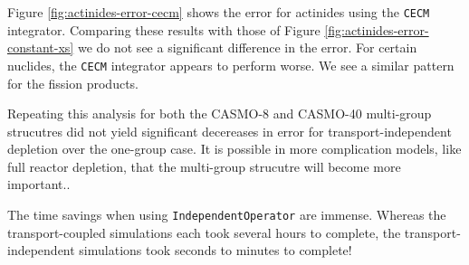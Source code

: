     Figure \ref{fig:actinides-error-cecm} shows the error for actinides using the
    \verb.CECM. integrator. Comparing these results with those of Figure
    \ref{fig:actinides-error-constant-xs} we do not see a significant difference
    in the error. For certain nuclides, the \verb.CECM. integrator appears to
    perform worse. We see a similar pattern for the fission products.

    Repeating this analysis for both the CASMO-8 and CASMO-40 multi-group
    strucutres did not yield significant decereases in error for
    transport-independent depletion over the one-group case. It is possible in
    more complication models, like full reactor depletion, that the multi-group
    strucutre will become more important..

    The time savings when using \verb.IndependentOperator. are immense. Whereas
    the transport-coupled simulations each took several hours to complete, the
    transport-independent simulations took seconds to minutes to complete!


